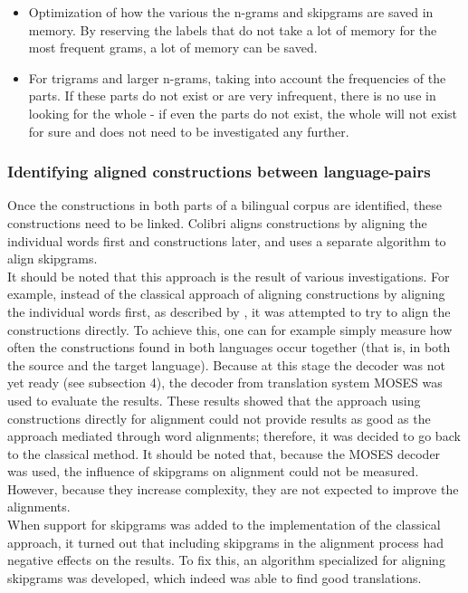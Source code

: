 \documentclass[12pt]{article}
\begin{document}
\begin{itemize}
\item Optimization of how the various the n-grams and skipgrams are saved in memory. By reserving the labels that do not take a lot of memory for the most frequent grams, a lot of memory can be saved.
\item For trigrams and larger n-grams, taking into account the frequencies of the parts. If these parts do not exist or are very infrequent, there is no use in looking for the whole - if even the parts do not exist, the whole will not exist for sure and does not need to be investigated any further.
\end{itemize}

\subsubsection{Identifying aligned constructions between language-pairs}
Once the constructions in both parts of a bilingual corpus are identified, these constructions need to be linked. Colibri aligns constructions by aligning the individual words first and constructions later, and uses a separate algorithm to align skipgrams.\\\indent
It should be noted that this approach is the result of various investigations. For example, instead of the classical approach of aligning constructions by aligning the individual words first, as described by \citep{koehn03}, it was attempted to try to align the constructions directly. To achieve this, one can for example simply measure how often the constructions found in both languages occur together (that is, in both the source and the target language). Because at this stage the decoder was not yet ready (see subsection 4), the decoder from translation system MOSES \citep{koehnea07} was used to evaluate the results. These results showed that the approach using constructions directly for alignment could not provide results as good as the approach mediated through word alignments; therefore, it was decided to go back to the classical method. It should be noted that, because the MOSES decoder was used, the influence of skipgrams on alignment could not be measured. However, because they increase complexity, they are not expected to improve the alignments.\\\indent
When support for skipgrams was added to the implementation of the classical approach, it turned out that including skipgrams in the alignment process had negative effects on the results. To fix this, an algorithm specialized for aligning skipgrams was developed, which indeed was able to find good translations. 
\end{document}
